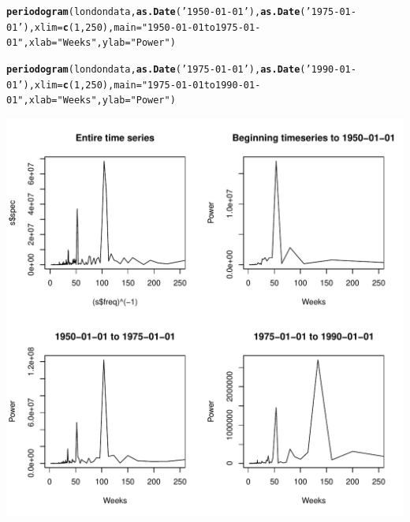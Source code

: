 \documentclass[12pt]{article}\usepackage[]{graphicx}\usepackage[]{color}
\makeatletter
\def\maxwidth{ %
  \ifdim\Gin@nat@width>\linewidth
    \linewidth
  \else
    \Gin@nat@width
  \fi
}
\newcommand{\hlnum}[1]{\textcolor[rgb]{0.686,0.059,0.569}{#1}}%
\newcommand{\hlstr}[1]{\textcolor[rgb]{0.192,0.494,0.8}{#1}}%
\newcommand{\hlstd}[1]{\textcolor[rgb]{0.345,0.345,0.345}{#1}}%
\newcommand{\hlkwc}[1]{\textcolor[rgb]{0.333,0.667,0.333}{#1}}%
\newcommand{\hlkwd}[1]{\textcolor[rgb]{0.737,0.353,0.396}{\textbf{#1}}}%
\newenvironment{kframe}{%
 \def\at@end@of@kframe{}%
 \ifinner\ifhmode%
  \def\at@end@of@kframe{\end{minipage}}%
  \begin{minipage}{\columnwidth}%
 \fi\fi%
 \def\FrameCommand##1{\hskip\@totalleftmargin \hskip-\fboxsep
 \colorbox{shadecolor}{##1}\hskip-\fboxsep
     \hskip-\linewidth \hskip-\@totalleftmargin \hskip\columnwidth}%
 \MakeFramed {\advance\hsize-\width
   \@totalleftmargin\z@ \linewidth\hsize
   \@setminipage}}%
 {\par\unskip\endMakeFramed%
 \at@end@of@kframe}
\newenvironment{knitrout}{}{} %
\makeatother
\begin{document}
\begin{enumerate}[(a)]
\begin{knitrout}
\begin{kframe}
\begin{alltt}
\hlkwd{periodogram}\hlstd{(londondata,}\hlkwd{as.Date}\hlstd{(}\hlstr{'1950-01-01'}\hlstd{),}\hlkwd{as.Date}\hlstd{(}\hlstr{'1975-01-01'}\hlstd{),}\hlkwc{xlim}\hlstd{=}\hlkwd{c}\hlstd{(}\hlnum{1}\hlstd{,}\hlnum{250}\hlstd{),} \hlkwc{main}\hlstd{=}\hlstr{"1950-01-01 to 1975-01-01"}\hlstd{,}\hlkwc{xlab}\hlstd{=}\hlstr{"Weeks"}\hlstd{,} \hlkwc{ylab}\hlstd{=}\hlstr{"Power"}\hlstd{)}

\hlkwd{periodogram}\hlstd{(londondata,}\hlkwd{as.Date}\hlstd{(}\hlstr{'1975-01-01'}\hlstd{),}\hlkwd{as.Date}\hlstd{(}\hlstr{'1990-01-01'}\hlstd{),}\hlkwc{xlim}\hlstd{=}\hlkwd{c}\hlstd{(}\hlnum{1}\hlstd{,}\hlnum{250}\hlstd{),} \hlkwc{main}\hlstd{=}\hlstr{"1975-01-01 to 1990-01-01"}\hlstd{,}\hlkwc{xlab}\hlstd{=}\hlstr{"Weeks"}\hlstd{,} \hlkwc{ylab}\hlstd{=}\hlstr{"Power"}\hlstd{)}
\end{alltt}
\end{kframe}
\includegraphics[width=\maxwidth]{figure/unnamed-chunk-4-2} 

\end{knitrout}


\end{enumerate}
\end{document}
